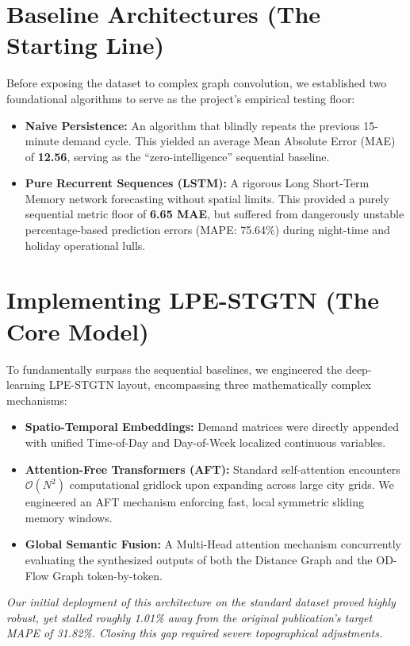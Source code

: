 \documentclass[11pt,a4paper]{article}
\begin{document}
\section{Baseline Architectures (The Starting Line)}
Before exposing the dataset to complex graph convolution, we established two foundational algorithms to serve as the project's empirical testing floor:
\begin{itemize}
    \item \textbf{Naive Persistence:} An algorithm that blindly repeats the previous 15-minute demand cycle. This yielded an average Mean Absolute Error (MAE) of \textbf{12.56}, serving as the ``zero-intelligence'' sequential baseline.
    \item \textbf{Pure Recurrent Sequences (LSTM):} A rigorous Long Short-Term Memory network forecasting without spatial limits. This provided a purely sequential metric floor of \textbf{6.65 MAE}, but suffered from dangerously unstable percentage-based prediction errors (MAPE: 75.64\%) during night-time and holiday operational lulls.
\end{itemize}

\section{Implementing LPE-STGTN (The Core Model)}
To fundamentally surpass the sequential baselines, we engineered the deep-learning LPE-STGTN layout, encompassing three mathematically complex mechanisms:
\begin{itemize}
    \item \textbf{Spatio-Temporal Embeddings:} Demand matrices were directly appended with unified Time-of-Day and Day-of-Week localized continuous variables.
    \item \textbf{Attention-Free Transformers (AFT):} Standard self-attention encounters $\mathcal{O}(N^2)$ computational gridlock upon expanding across large city grids. We engineered an AFT mechanism enforcing fast, local symmetric sliding memory windows.
    \item \textbf{Global Semantic Fusion:} A Multi-Head attention mechanism concurrently evaluating the synthesized outputs of both the Distance Graph and the OD-Flow Graph token-by-token.
\end{itemize}

\textit{Our initial deployment of this architecture on the standard dataset proved highly robust, yet stalled roughly 1.01\% away from the original publication's target MAPE of 31.82\%. Closing this gap required severe topographical adjustments.}
\end{document}
